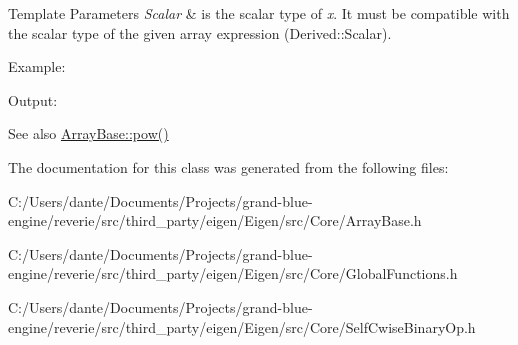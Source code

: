\begin{DoxyTemplParams}{Template Parameters}
{\em Scalar} & is the scalar type of {\itshape x}. It must be compatible with the scalar type of the given array expression ({\ttfamily Derived\+::\+Scalar}).\\
\hline
\end{DoxyTemplParams}
Example\+: 
\begin{DoxyCodeInclude}{0}
\end{DoxyCodeInclude}
 Output\+: 
\begin{DoxyVerbInclude}
\end{DoxyVerbInclude}


\begin{DoxySeeAlso}{See also}
\mbox{\hyperlink{class_eigen_1_1_array_base_ab6dc101d82e8228a19a8840e3a29c1c9}{Array\+Base\+::pow()}} 
\end{DoxySeeAlso}


The documentation for this class was generated from the following files\+:\begin{DoxyCompactItemize}
\item 
C\+:/\+Users/dante/\+Documents/\+Projects/grand-\/blue-\/engine/reverie/src/third\+\_\+party/eigen/\+Eigen/src/\+Core/Array\+Base.\+h\item 
C\+:/\+Users/dante/\+Documents/\+Projects/grand-\/blue-\/engine/reverie/src/third\+\_\+party/eigen/\+Eigen/src/\+Core/Global\+Functions.\+h\item 
C\+:/\+Users/dante/\+Documents/\+Projects/grand-\/blue-\/engine/reverie/src/third\+\_\+party/eigen/\+Eigen/src/\+Core/Self\+Cwise\+Binary\+Op.\+h\end{DoxyCompactItemize}
